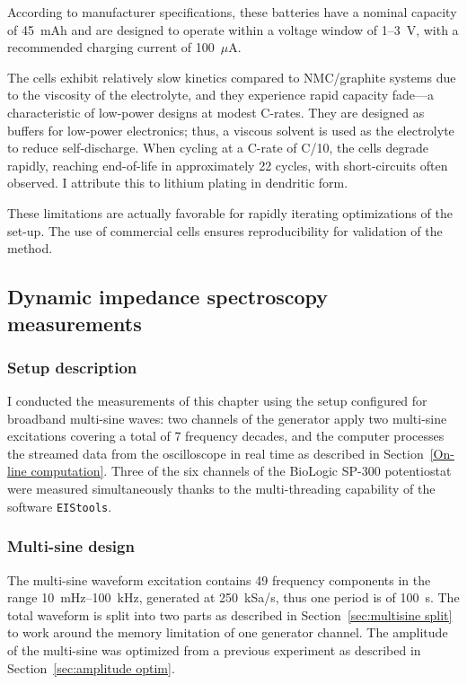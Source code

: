 According to manufacturer specifications, these batteries have a nominal capacity of 45~mAh and are designed to operate within a voltage window of 1--3~V, with a recommended charging current of 100~$\mu$A. 

The cells exhibit relatively slow kinetics compared to NMC/graphite systems due to the viscosity of the electrolyte, and they experience rapid capacity fade---a characteristic of low-power designs at modest C-rates. 
They are designed as buffers for low-power electronics; thus, a viscous solvent is used as the electrolyte to reduce self-discharge.
When cycling at a C-rate of C/10, the cells degrade rapidly, reaching end-of-life in approximately 22 cycles, with short-circuits often observed. 
I attribute this to lithium plating in dendritic form.

These limitations are actually favorable for rapidly iterating optimizations of the set-up.
The use of commercial cells ensures reproducibility for validation of the method. 

\subsection{Dynamic impedance spectroscopy measurements}

\subsubsection{Setup description}
I conducted the measurements of this chapter using the setup configured for broadband multi-sine waves: two channels of the generator apply two multi-sine excitations covering a total of 7 frequency decades, and the computer processes the streamed data from the oscilloscope in real time as described in Section~\ref{On-line computation}. 
Three of the six channels of the BioLogic SP-300 potentiostat were measured simultaneously thanks to the multi-threading capability of the software \verb|EIStools|. 

\subsubsection{Multi-sine design}
The multi-sine waveform excitation contains 49 frequency components in the range 10~mHz--100~kHz, generated at 250~kSa/s, thus one period is of 100~s. 
The total waveform is split into two parts as described in Section~\ref{sec:multisine split} to work around the memory limitation of one generator channel. 
The amplitude of the multi-sine was optimized from a previous experiment as described in Section~\ref{sec:amplitude optim}. 

